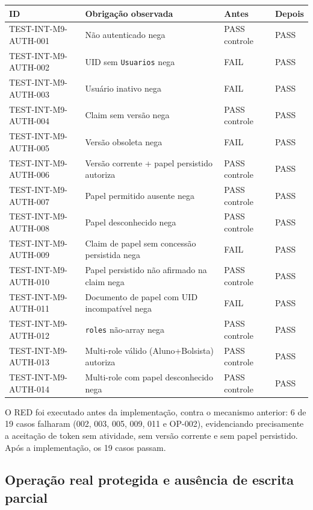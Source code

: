 \small
\begin{longtable}{@{}p{}p{}p{}p{}@{}}
\toprule
ID & Obrigação observada & Antes & Depois \\
\midrule
\endhead
TEST-INT-M9-AUTH-001 & Não autenticado nega & PASS controle & PASS \\
TEST-INT-M9-AUTH-002 & UID sem \texttt{Usuarios} nega & FAIL & PASS \\
TEST-INT-M9-AUTH-003 & Usuário inativo nega & FAIL & PASS \\
TEST-INT-M9-AUTH-004 & Claim sem versão nega & PASS controle & PASS \\
TEST-INT-M9-AUTH-005 & Versão obsoleta nega & FAIL & PASS \\
TEST-INT-M9-AUTH-006 & Versão corrente + papel persistido autoriza & PASS controle & PASS \\
TEST-INT-M9-AUTH-007 & Papel permitido ausente nega & PASS controle & PASS \\
TEST-INT-M9-AUTH-008 & Papel desconhecido nega & PASS controle & PASS \\
TEST-INT-M9-AUTH-009 & Claim de papel sem concessão persistida nega & FAIL & PASS \\
TEST-INT-M9-AUTH-010 & Papel persistido não afirmado na claim nega & PASS controle & PASS \\
TEST-INT-M9-AUTH-011 & Documento de papel com UID incompatível nega & FAIL & PASS \\
TEST-INT-M9-AUTH-012 & \texttt{roles} não-array nega & PASS controle & PASS \\
TEST-INT-M9-AUTH-013 & Multi-role válido (Aluno+Bolsista) autoriza & PASS controle & PASS \\
TEST-INT-M9-AUTH-014 & Multi-role com papel desconhecido nega & PASS controle & PASS \\
\bottomrule
\end{longtable}
\normalsize

O RED foi executado antes da implementação, contra o mecanismo anterior: 6 de 19
casos falharam (002, 003, 005, 009, 011 e OP-002), evidenciando precisamente a
aceitação de token sem atividade, sem versão corrente e sem papel persistido.
Após a implementação, os 19 casos passam.

\subsection{Operação real protegida e ausência de escrita parcial}

